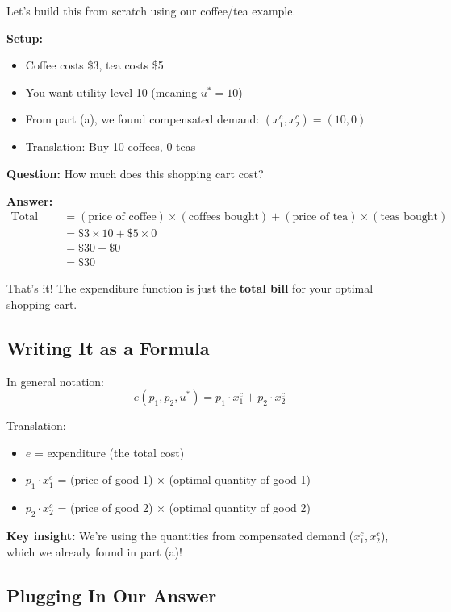 \documentclass[11pt]{article}
\begin{document}
Let's build this from scratch using our coffee/tea example.

\textbf{Setup:}
\begin{itemize}
\item Coffee costs \$3, tea costs \$5
\item You want utility level 10 (meaning $u^* = 10$)
\item From part (a), we found compensated demand: $(x_1^c, x_2^c) = (10, 0)$
\item Translation: Buy 10 coffees, 0 teas
\end{itemize}

\textbf{Question:} How much does this shopping cart cost?

\textbf{Answer:}
\begin{align*}
\text{Total cost} &= (\text{price of coffee}) \times (\text{coffees bought}) + (\text{price of tea}) \times (\text{teas bought}) \\
&= \$3 \times 10 + \$5 \times 0 \\
&= \$30 + \$0 \\
&= \$30
\end{align*}

That's it! The expenditure function is just the \textbf{total bill} for your optimal shopping cart.

\subsection{Writing It as a Formula}

In general notation:
\begin{equation}
e(p_1, p_2, u^*) = p_1 \cdot x_1^c + p_2 \cdot x_2^c
\end{equation}

Translation:
\begin{itemize}
\item $e$ = expenditure (the total cost)
\item $p_1 \cdot x_1^c$ = (price of good 1) $\times$ (optimal quantity of good 1)
\item $p_2 \cdot x_2^c$ = (price of good 2) $\times$ (optimal quantity of good 2)
\end{itemize}

\textbf{Key insight:} We're using the quantities from compensated demand ($x_1^c, x_2^c$), which we already found in part (a)!

\subsection{Plugging In Our Answer}
\end{document}
